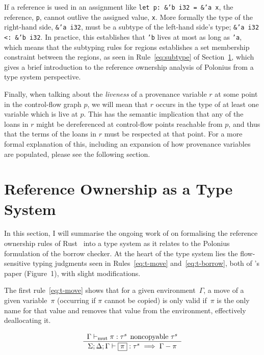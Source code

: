 \documentclass[11pt,a4paper,twoside,openany]{report}
\newcommand{\InRust}[1]{\texttt{#1}}
\newcommand{\expression}[1]{\boxed{#1}}
\newcommand{\ntyperule}[2]{\begin{array}{c}#1\\\hline\raisebox{1pt}{\strut}#2\end{array}}
\begin{document}
If a reference is used in an assignment like \InRust{let p: &'b i32 = &'a x},
the reference, \InRust{p}, cannot outlive the assigned value, \InRust{x}. More
formally the type of the right-hand side, \InRust{&'a i32}, must be a subtype of
the left-hand side's type; \InRust{&'a i32 <: &'b i32}. In practice, this
establishes that \InRust{'b} lives at most as long as \InRust{'a}, which means
that the subtyping rules for regions establishes a set membership constraint
between the regions, as seen in Rule~\ref{eq:subtype} of
Section~\ref{sec:type-system}, which gives a brief introduction to the reference
ownership analysis of Polonius from a type system perspective.

Finally, when talking about the \emph{liveness} of a provenance variable $r$ at
some point in the control-flow graph $p$, we will mean that $r$ occurs in the
type of at least one variable which is live at $p$. This has the semantic
implication that any of the loans in $r$ might be dereferenced at control-flow
points reachable from $p$, and thus that the terms of the loans in $r$ must be
respected at that point. For a more formal explanation of this, including an
expansion of how provenance variables are populated, please see the following
section.

\section{Reference Ownership as a Type System}\label{sec:type-system}

In this section, I will summarise the ongoing work of
\citeauthor{weiss_oxide:_2019} on formalising the reference ownership rules of
Rust~\cite{weiss_oxide:_2019} into a type system as it relates to the Polonius
formulation of the borrow checker. At the heart of the type system lies the
flow-sensitive typing judgments seen in Rules~\ref{eq:t-move}
and~\ref{eq:t-borrow}, both of \citeauthor{weiss_oxide:_2019}'s paper
(Figure~1), with slight modifications.

The first rule~\eqref{eq:t-move} shows that for a given environment~$\Gamma$, a
move of a given variable~$\pi$ (occurring if $\pi$ cannot be copied) is only
valid if~$\pi$ is the only name for that value and removes that value from the
environment, effectively deallocating it.

\begin{equation}\label{eq:t-move}
  \ntyperule{\Gamma \vdash_{\text{mut}} \pi : \tau^s \:\: \text{noncopyable } \tau^s}
  {\Sigma ; \Delta ; \Gamma \vdash \expression{\pi} : \tau^s \implies \Gamma - \pi}
  \end{equation}
\end{document}
